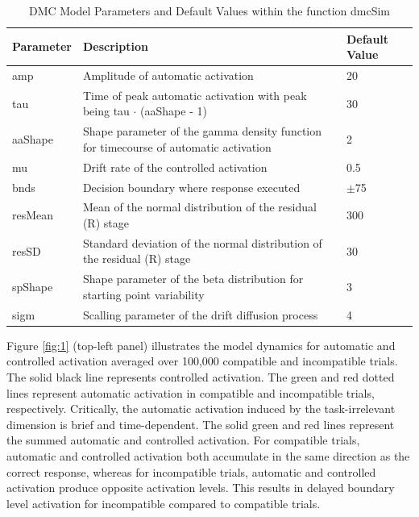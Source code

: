 \begin{table}
    \centering
    \caption{DMC Model Parameters and Default Values within the function dmcSim}
    \begin{tabular}{lll}
        \hline
        Parameter&Description&Default Value \\ 
        \hline
        amp & Amplitude of automatic activation & 20\\ 
        tau & Time of peak automatic activation with peak being tau $\cdot$ (aaShape - 1) & 30\\ 
        aaShape & Shape parameter of the gamma density function for timecourse of automatic activation & 2\\ 
        mu & Drift rate of the controlled activation & 0.5\\ 
        bnds & Decision boundary where response executed & $\pm$75\\ 
        resMean & Mean of the normal distribution of the residual (R) stage & 300\\ 
        resSD & Standard deviation of the normal distribution of the residual (R) stage & 30\\ 
        spShape & Shape parameter of the beta distribution for starting point variability & 3\\ 
        sigm & Scalling parameter of the drift diffusion process & 4\\ 
        \hline
    \end{tabular}
    \label{tab:dmc_parameters}
\end{table}

Figure \ref{fig:1} (top-left panel) illustrates the model dynamics for
automatic and controlled activation averaged over 100,000 compatible and
incompatible trials. The solid black line represents controlled activation. The
green and red dotted lines represent automatic activation in compatible and
incompatible trials, respectively. Critically, the automatic activation induced
by the task-irrelevant dimension is brief and time-dependent. The solid green
and red lines represent the summed automatic and controlled activation. For
compatible trials, automatic and controlled activation both accumulate in the
same direction as the correct response, whereas for incompatible trials,
automatic and controlled activation produce opposite activation levels. This
results in delayed boundary level activation for incompatible compared to
compatible trials.

